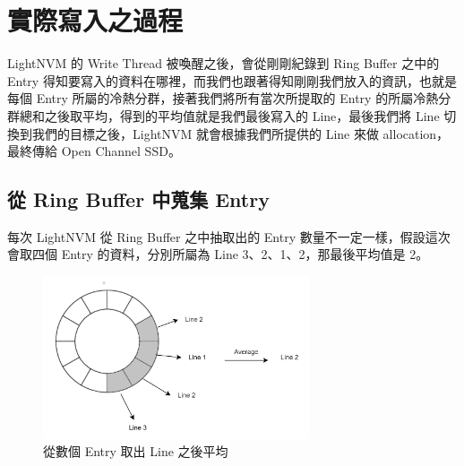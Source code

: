 \section{實際寫入之過程}\label{s3.3}
\indent
LightNVM 的 Write Thread 被喚醒之後，會從剛剛紀錄到 Ring Buffer 之中的 Entry 得知要寫入的資料在哪裡，而我們也跟著得知剛剛我們放入的資訊，也就是每個 Entry 所屬的冷熱分群，接著我們將所有當次所提取的 Entry 的所屬冷熱分群總和之後取平均，得到的平均值就是我們最後寫入的 Line，最後我們將 Line 切換到我們的目標之後，LightNVM 就會根據我們所提供的 Line 來做 allocation，最終傳給 Open Channel SSD。

\subsection{從 Ring Buffer 中蒐集 Entry}\label{s3.3.1}
\indent
每次 LightNVM 從 Ring Buffer 之中抽取出的 Entry 數量不一定一樣，假設這次會取四個 Entry 的資料，分別所屬為 Line 3、2、1、2，那最後平均值是 2。

\begin{figure}[H]
    \centering
    \includegraphics[width=0.7\textwidth]{picture/ch3/get_entry_from_ring_buffer.png}
    \caption{從數個 Entry 取出 Line 之後平均}
    \label{f3.6}
\end{figure}

